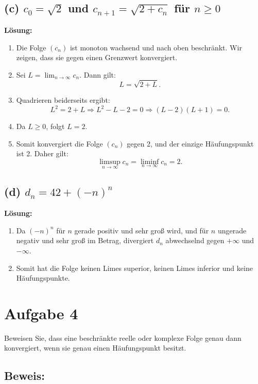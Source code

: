 \documentclass[11pt]{article}
\begin{document}
\subsection*{(c) \( c_0 = \sqrt{2} \) und \( c_{n+1} = \sqrt{2 + c_n} \) für \( n \geq 0 \)}

\textbf{Lösung:}
\begin{enumerate}
    \item Die Folge \( (c_n) \) ist monoton wachsend und nach oben beschränkt. Wir zeigen, dass sie gegen einen Grenzwert konvergiert.
    \item Sei \( L = \lim_{n \to \infty} c_n \). Dann gilt:
    \[
    L = \sqrt{2 + L}.
    \]
    \item Quadrieren beiderseits ergibt:
    \[
    L^2 = 2 + L \Rightarrow L^2 - L - 2 = 0 \Rightarrow (L - 2)(L + 1) = 0.
    \]
    \item Da \( L \geq 0 \), folgt \( L = 2 \).
    \item Somit konvergiert die Folge \( (c_n) \) gegen 2, und der einzige Häufungspunkt ist 2. Daher gilt:
    \[
    \limsup_{n \to \infty} c_n = \liminf_{n \to \infty} c_n = 2.
    \]
\end{enumerate}

\subsection*{(d) \( d_n = 42 + (-n)^n \)}

\textbf{Lösung:}
\begin{enumerate}
    \item Da \( (-n)^n \) für \( n \) gerade positiv und sehr groß wird, und für \( n \) ungerade negativ und sehr groß im Betrag, divergiert \( d_n \) abwechselnd gegen \( +\infty \) und \( -\infty \).
    \item Somit hat die Folge keinen Limes superior, keinen Limes inferior und keine Häufungspunkte.
\end{enumerate}


\section*{Aufgabe 4}

Beweisen Sie, dass eine beschränkte reelle oder komplexe Folge genau dann konvergiert, wenn sie genau einen Häufungspunkt besitzt.

\subsection*{Beweis:}
\end{document}
